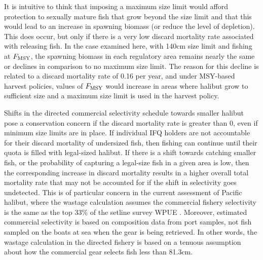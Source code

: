 It is intuitive to think that imposing a maximum size limit would afford protection to sexually mature fish that grow beyond the size limit and that this would lead to an increase in spawning biomass (or reduce the level of depletion).  This does occur, but only if there is a very low discard mortality rate associated with releasing fish.  In the case examined here, with 140cm size limit and fishing at $F_{\rm{MSY}}$, the spawning biomass in each regulatory area remains nearly the same or  declines in comparison to no maximum size limit.  The reason for this decline is related to a discard mortality rate of 0.16 per year, and under MSY-based harvest policies, values of $F_{\rm{MSY}}$ would increase in areas where halibut grow to sufficient size and a maximum size limit is used in the harvest policy.

Shifts in the directed commercial selectivity schedule towards smaller halibut pose a conservation concern if the discard mortality rate is greater than 0, even if minimum size limits are in place. If individual IFQ holders are not accountable for their discard mortality of undersized fish, then fishing can continue until their quota is filled with legal-sized halibut.  If there is a shift towards catching smaller fish, or the probability of capturing a legal-size fish in a given area is low, then the corresponding increase in discard mortality  results in a higher overall total mortality rate that may not be accounted for if the shift in selectivity goes undetected.  This is of particular concern in the current assessment of Pacific halibut, where the wastage calculation assumes the commercial fishery selectivity is the same as the top 33\% of the setline survey WPUE \citep{gilroy2009wastage}.  Moreover, estimated commercial selectivity is based on composition data from port samples, not fish sampled on the boats at sea when the gear is being retrieved. In other words, the wastage calculation in the directed fishery is based on a tenuous assumption about how the commercial gear selects fish less than 81.3cm.

